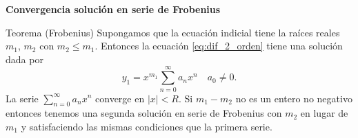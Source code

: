 \begin{frame}[fragile]{\textbf{Convergencia solución en serie de Frobenius}}

\begin{block}{Teorema (Frobenius)} 
Supongamos que la ecuación indicial tiene la raíces reales $m_1$, $m_2$ con  $m_2\leq m_1$.  Entonces la ecuación \eqref{eq:dif_2_orden}  tiene una solución  dada por
\[y_1=x^{m_1}\sum_{n=0}^{\infty}a_nx^n\quad a_0\neq 0.\]
La serie $\sum_{n=0}^{\infty}a_nx^n$ converge en $|x|<R$. Si $m_1-m_2$ no es un entero no negativo entonces tenemos una segunda solución en serie de Frobenius con $m_2$ en lugar de $m_1$ y satisfaciendo las mismas condiciones que la primera serie.
\end{block}

\end{frame}







%
